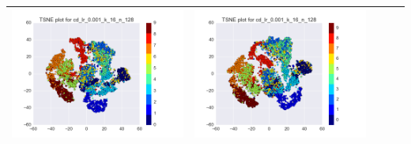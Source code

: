\documentclass[12pt]{report}
\begin{document}
\begin{table}[H]
\begin{tabular}{ | c | c | c | c || c |}
\begin{minipage}{.3\textwidth}
      \includegraphics[scale=0.25]{cd_lr_0_001_k_16_n_128.png}
    \end{minipage} &
    \begin{minipage}{.3\textwidth}
      \includegraphics[scale=0.25]{test_cd_lr_0_001_k_16_n_128.png}
    \end{minipage}
        \\ \hline
  \end{tabular}
\end{table}
\end{document}
